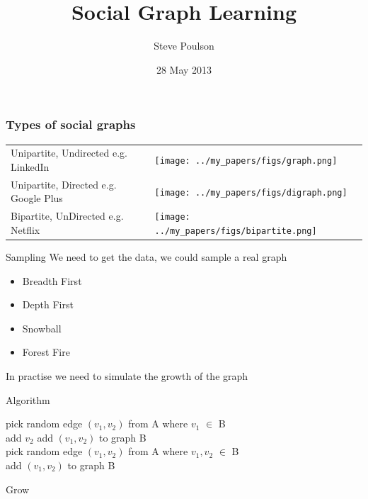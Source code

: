 \documentclass{beamer}
\title[Short Paper Title] %
{Social Graph Learning}
\author[Author, Another] %
{Steve Poulson}
\institute[Universities of Somewhere and Elsewhere] %
{Supervisor: Dell Zhang, Mark Levine}
\date[CFP 2003] %
{28 May 2013}
\begin{document}
\begin{frame}
  \titlepage
\end{frame}

\begin{frame}
\frametitle{Types of social graphs}
\begin{table}[h!]
     \begin{center}
     \begin{tabular}[c]{ l  p{5cm}  p{5cm}  }
      Unipartite, Undirected e.g. LinkedIn & \texttt{[image: ../my\_papers/figs/graph.png]} &
      \\
     \pause
      Unipartite, Directed e.g. Google Plus & \texttt{[image: ../my\_papers/figs/digraph.png]} &
      \\
      \pause
      Bipartite, UnDirected e.g. Netflix & \texttt{[image: ../my\_papers/figs/bipartite.png]} &
      \end{tabular}
      \end{center}
      \end{table}
\end{frame}

\begin{frame}{Sampling}
We need to get the data, we could sample a real graph
\\
  \begin{itemize}
	\item Breadth First
	\pause
	\item Depth First
	\pause
	\item Snowball
	\pause
	\item Forest Fire
  \end{itemize}
In practise we need to simulate the growth of the graph
\end{frame}

\begin{frame}{Algorithm}
\begin{algorithm}[H]
 \SetAlgoLined
 {
 	pick random edge $(v_1,v_2)$ from A where $v_1$ $\in$ B \\
 	add $v_2$
 	add $(v_1,v_2)$ to graph B\\
 }
  {
  	pick random edge $(v_1,v_2)$ from A where $v_1,v_2$ $\in$ B \\
 	add $(v_1,v_2)$ to graph B\\
  }
 \caption{Grow}
\end{algorithm}
\end{frame}
\end{document}
